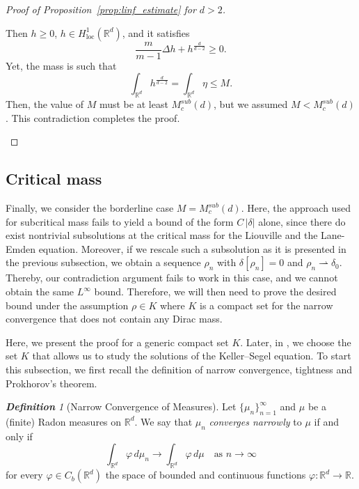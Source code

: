 \documentclass[11pt,a4paper]{article}
\numberwithin{equation}{section}
\newcommand{\R}{{\mathbb{R}}}
\theoremstyle{plain}
\theoremstyle{remark}
\newtheorem{definition}[theorem]{\bf Definition}
\newcommand {\f}{\frac}
\begin{document}
\begin{proof}[Proof of Proposition~\ref{prop:linf_estimate} for $d>2$]
\begin{enumeratesteps}
Then $h\ge 0$, $h\in H^1_{\mathrm{loc}}(\mathbb{R}^d)$, and it satisfies
\[
\f{m}{m-1}\Delta h + h^{\f{d}{d-2}}  \ge  0.
\]
Yet, the mass is such that
\[
\int_{\mathbb{R}^d} h^{\f{d}{d-2}}  =  \int_{\mathbb{R}^d} \eta  \le  M .
\]
Then, the value of $M$ must be at least $M^{sub}_c(d)$, but we assumed $M<M^{sub}_c(d)$. This contradiction completes the proof.\qedhere
\end{enumeratesteps}
\end{proof}

\subsection{Critical mass}


Finally, we consider the borderline case $M = M^{sub}_c(d)$. Here, the approach used for subcritical mass fails to yield a bound of the form $C\,|\delta|$ alone, since there do exist nontrivial subsolutions at the critical mass for the Liouville and the Lane-Emden equation. Moreover, if we rescale such a subsolution as it is presented in the previous subsection, we obtain a sequence $\rho_n$ with $\delta[\rho_n]=0$ and $\rho_n\rightharpoonup\delta_0$. Thereby, our contradiction argument fails to work in this case, and we cannot obtain the same $L^\infty$ bound. 
Therefore, we will then need to prove the desired bound under the assumption $\rho\in K$ where $K$ is a compact set for the narrow convergence that does not contain any Dirac mass.


Here, we present the proof for a generic compact set $K$. Later, in , we choose the set $K$ that allows us to study the solutions of the Keller--Segel equation. To start this subsection, we first recall the definition of narrow convergence, tightness and Prokhorov's theorem. 

\begin{definition}[Narrow Convergence of Measures]
Let $\{\mu_n\}_{n=1}^\infty$ and $\mu$ be a (finite) Radon measures on $\mathbb{R}^d$. We say that $\mu_n$ \emph{converges narrowly} to $\mu$ if and only if
\[
\int_{\mathbb{R}^d} \varphi \,d\mu_n 
   \to
\int_{\mathbb{R}^d} \varphi \,d\mu
\quad\text{as }n\to\infty
\]
for every $\varphi\in C_{b}(\R^d)$ the space of bounded and continuous functions $\varphi: \mathbb{R}^d \to \mathbb{R}$. 
\end{definition}
\end{document}
